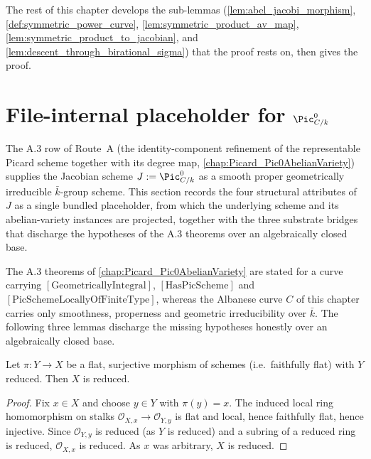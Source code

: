 The rest of this chapter develops the sub-lemmas
(\cref{lem:abel_jacobi_morphism}, \cref{def:symmetric_power_curve},
\cref{lem:symmetric_product_av_map}, \cref{lem:symmetric_product_to_jacobian},
and \cref{lem:descent_through_birational_sigma}) that the proof rests on,
then gives the proof.

\section{File-internal placeholder for \(\Pic^0_{C/k}\)}
\label{sec:albaneseup_pic0_placeholder}

The A.3 row of Route~A (the identity-component refinement of the representable
Picard scheme together with its degree map, \cref{chap:Picard_Pic0AbelianVariety})
supplies the Jacobian scheme \(J := \Pic^0_{C/k}\) as a smooth proper
geometrically irreducible \(\bar k\)-group scheme. This section records the
four structural attributes of \(J\) as a single bundled placeholder, from
which the underlying scheme and its abelian-variety instances are projected,
together with the three substrate bridges that discharge the hypotheses of
the A.3 theorems over an algebraically closed base.

The A.3 theorems of \cref{chap:Picard_Pic0AbelianVariety} are stated for a
curve carrying \([\mathrm{GeometricallyIntegral}]\), \([\mathrm{HasPicScheme}]\)
and \([\mathrm{PicSchemeLocallyOfFiniteType}]\), whereas the Albanese curve
\(C\) of this chapter carries only smoothness, properness and geometric
irreducibility over \(\bar k\). The following three lemmas discharge the
missing hypotheses honestly over an algebraically closed base.

\begin{lemma}
  \label{lem:isReduced_of_flat_of_surjective}

  Let \(\pi \colon Y \to X\) be a flat, surjective morphism of schemes (i.e.\
  faithfully flat) with \(Y\) reduced. Then \(X\) is reduced.
\end{lemma}

\begin{proof}\leanok
  Fix \(x \in X\) and choose \(y \in Y\) with \(\pi(y) = x\). The induced
  local ring homomorphism on stalks \(\mathcal O_{X,x} \to \mathcal O_{Y,y}\)
  is flat and local, hence faithfully flat, hence injective. Since
  \(\mathcal O_{Y,y}\) is reduced (as \(Y\) is reduced) and a subring of a
  reduced ring is reduced, \(\mathcal O_{X,x}\) is reduced. As \(x\) was
  arbitrary, \(X\) is reduced.
\end{proof}

